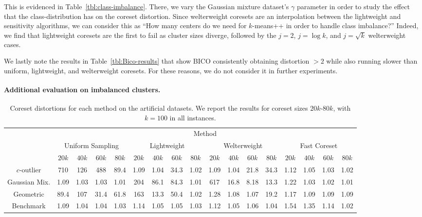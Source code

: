 This is evidenced in Table~\ref{tbl:class-imbalance}. There, we vary the Gaussian mixture dataset's
$\gamma$ parameter in order to study the effect that the class-distribution has on the coreset distortion. Since welterweight coresets are an interpolation
between the lightweight and sensitivity algorithms, we can consider this as ``How many centers do we need for $k$-means++ in order to handle class imbalance?''
Indeed, we find that lightweight coresets are the first to fail as cluster sizes diverge, followed by the $j=2$, $j=\log k$, and $j=\sqrt{k}$ welterweight
cases.

We lastly note the results in Table~\ref{tbl:Bico-results} that show BICO consistently obtaining distortion $>2$ while also running slower than uniform,
lightweight, and welterweight coresets. For these reasons, we do not consider it in further experiments.



\paragraph*{Additional evaluation on imbalanced clusters.}

\begin{table*}[htbp]
    \centering
    \small
    \begin{tabular}{|c|cccc|cccc|cccc|cccc|}
        \hline
        & \multicolumn{16}{c|}{Method} \\
        \cline{2-17}
        & \multicolumn{4}{c|}{Uniform Sampling} & \multicolumn{4}{c|}{Lightweight} & \multicolumn{4}{c|}{Welterweight} & \multicolumn{4}{c|}{Fast Coreset} \\
        & $20k$ & $40k$ & $60k$ & $80k$ & $20k$ & $40k$ & $60k$ & $80k$ & $20k$ & $40k$ & $60k$ & $80k$ & $20k$ & $40k$ & $60k$ & $80k$ \\
        \cline{2-17}
        $c$-outlier & 710 & 126 & 488 & 89.4 & 1.09 & 1.04 & 34.3 & 1.02 & 1.09 & 1.04 & 21.8 & 34.3 & 1.12 & 1.05 & 1.03 & 1.02 \\
        Gaussian Mix. & 1.09 & 1.03 & 1.03 & 1.01 & 204 & 86.1 & 84.3 & 1.01 & 617 & 16.8 & 8.18 & 13.3 & 1.22 & 1.03 & 1.02 & 1.01 \\
        Geometric & 89.4 & 107 & 31.4 & 61.8 & 163 & 13.3 & 50.4 & 1.02 & 1.28 & 1.08 & 1.07 & 19.2 & 1.17 & 1.09 & 1.09 & 1.09 \\
        Benchmark & 1.09 & 1.04 & 1.04 & 1.03 & 1.14 & 1.05 & 1.05 & 1.03 & 1.12 & 1.05 & 1.06 & 1.04 & 1.54 & 1.35 & 1.14 & 1.02 \\
        \hline
    \end{tabular}
    \caption{Coreset distortions for each method on the artificial datasets. We report the results for coreset sizes $20k$-$80k$, with $k=100$ in all
    instances.}
    \label{tbl:artificial_failure}
\end{table*}

